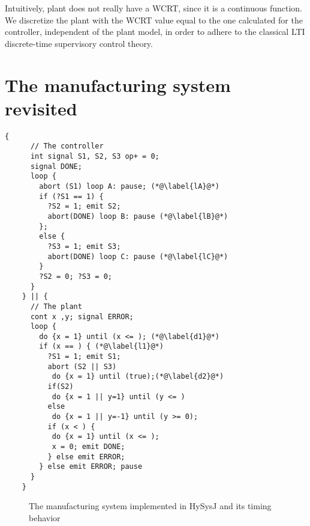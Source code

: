 \documentclass[10pt,journal,cspaper,compsoc]{IEEEtran}
\begin{document}
Intuitively, plant does not really have a WCRT, since it is a continuous
function. We discretize the plant with the WCRT value equal to the one
calculated for the controller, independent of the plant model, in order
to adhere to the classical LTI discrete-time supervisory control theory.

\section{The manufacturing system revisited}
\label{sec:manuf-syst-revis}

\newbox{\fman}
\begin{lrbox}{\fman}
  \begin{lstlisting}[mathescape,style=sysj,morekeywords={until,cont,signal,loop,abort,await,emit,present,trap,pause,exit,delay,suspend}]
    {
      // The controller
      int signal S1, S2, S3 op+ = 0;
      signal DONE;
      loop {
        abort (S1) loop A: pause; (*@\label{lA}@*)
        if (?S1 == 1) { 
          ?S2 = 1; emit S2; 
          abort(DONE) loop B: pause (*@\label{lB}@*)
        };
        else {
          ?S3 = 1; emit S3; 
          abort(DONE) loop C: pause (*@\label{lC}@*)
        }
        ?S2 = 0; ?S3 = 0;
      }
    } || {
      // The plant
      cont x ,y; signal ERROR;
      loop {
        do {x = 1} until (x <= ); (*@\label{d1}@*)
        if (x == ) { (*@\label{l1}@*) 
          ?S1 = 1; emit S1;
          abort (S2 || S3) 
           do {x = 1} until (true);(*@\label{d2}@*)
          if(S2) 
           do {x = 1 || y=1} until (y <= )
          else 
           do {x = 1 || y=-1} until (y >= 0);
          if (x < ) {
           do {x = 1} until (x <= );
           x = 0; emit DONE;
          } else emit ERROR;
        } else emit ERROR; pause
      }
    }
  \end{lstlisting}

\end{lrbox}
\begin{figure}[t!]
  
  \caption{The manufacturing system implemented in HySysJ and its timing
    behavior}
  \label{fig:19}
\end{figure}
\end{document}
